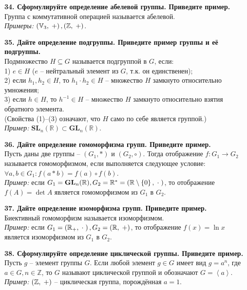 \documentclass[11pt,a4paper]{article}
\newcommand{\Z}{\mathbb{Z}}
\newcommand{\R}{\mathbb{R}}
\begin{document}
\textbf{34. Сформулируйте определение абелевой группы. Приведите пример.\\}
Группа с коммутативной операцией называется абелевой.\\
\textit{Примеры:} $\left( \mathbb{V}_3, \hspace{1mm} + \right), \left( \Z, \hspace{1mm} + \right)$.

\textbf{35. Дайте определение подгруппы. Приведите пример группы и её подгруппы.\\}
Подмножество $H \subseteq G$ называется подгруппой в $G$, если:\\
1) $e \in H$ ($e$ -- нейтральный элемент из $G$, т.к. он единственен);\\
2) если $h_1, h_2 \in H$, то $h_1 \cdot h_2 \in H$ -- множество $H$ замкнуто относительно умножения;\\
3) если $h \in H$, то $h^{-1} \in H$ -- множество $H$ замкнуто относительно взятия обратного элемента.\\
(Свойства (1)--(3) означают, что $H$ само по себе является группой.)\\
\textit{Пример:} $\mathbf{SL}_n( \R ) \subset \mathbf{GL}_n( \R )$.
\pagebreak

\textbf{36. Дайте определение гомоморфизма групп. Приведите пример.\\}
Пусть даны две группы -- $\left( G_1, * \right)$ и $\left( G_2, \circ \right)$. Тогда отображение $f: G_1 \rightarrow G_2$ называется гомоморфизмом, если выполняется следующее условие: $\forall a, b \in G_1: f(a * b) = f(a) \circ f(b)$.\\
\textit{Пример:} если $G_1 = \mathbf{GL}_n( \R ), G_2 = \R^* = \left( \R \setminus \left\{ 0 \right\}, \hspace{1mm} \cdot \hspace{1mm} \right)$, то отображение $f(A) = \det A$ является гомоморфизмом из $G_1$ в $G_2$.

\textbf{37. Дайте определение изоморфизма групп. Приведите пример.\\}
Биективный гомоморфизм называется изоморфизмом.\\
\textit{Пример:} если $G_1 = \left( \R_+, \hspace{1mm} \cdot \hspace{1mm} \right), G_2 = \left( \R, \hspace{1mm} + \right)$, то отображение $f(x) = \ln x$ является изоморфизмом из $G_1$ в $G_2$.

\textbf{38. Сформулируйте определение циклической группы. Приведите пример.\\}
Пусть $g$ -- элемент группы $G$. Если любой элемент $g \in G$ имеет вид $g = a^n$, где $a \in G, n \in \Z$, то $G$ называют циклической группой и обозначают $G = \left\langle a \right\rangle$.\\
\textit{Пример:} $\left( \Z, \hspace{1mm} + \right)$ -- циклическая группа, порождённая $a = 1$.
\end{document}
